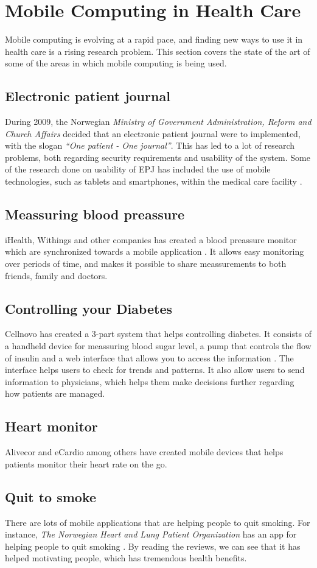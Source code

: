 \section{Mobile Computing in Health Care}
Mobile computing is evolving at a rapid pace, and finding new ways to use it in health care is a rising research problem. This section covers the state of the art of some of the areas in which mobile computing is being used.  

\subsection{Electronic patient journal}
During 2009, the Norwegian \emph{Ministry of Government Administration, Reform and Church Affairs} decided that an electronic patient journal were to implemented, with the slogan \emph{``One patient - One journal''}. This has led to a lot of research problems, both regarding security requirements and usability of the system. Some of the research done on usability of EPJ has included the use of mobile technologies, such as tablets and smartphones, within the medical care facility \cite{svanaes2010usability}.    

\subsection{Meassuring blood preassure}
iHealth, Withings and other companies has created a blood preassure monitor which are synchronized towards a mobile application \cite{ihealthlabs, withings}. It allows easy monitoring over periods of time, and makes it possible to share meassurements to both friends, family and doctors.


\subsection{Controlling your Diabetes}
Cellnovo has created a 3-part system that helps controlling diabetes. It consists of a handheld device for meassuring blood sugar level, a pump that controls the flow of insulin and a web interface that allows you to access the information \cite{cellnovo}. The interface helps users to check for trends and patterns. It also allow users to send information to physicians, which helps them make decisions further regarding how patients are managed.
   
\subsection{Heart monitor}
Alivecor and eCardio among others have created mobile devices that helps patients monitor their heart rate on the go\cite{eCardio, alivecor}. 

\subsection{Quit to smoke}
There are lots of mobile applications that are helping people to quit smoking. For instance, \emph{The Norwegian Heart and Lung Patient Organization} has an app for helping people to quit smoking \cite{roykeslutt}. By reading the reviews, we can see that it has helped motivating people, which has tremendous health benefits. 

